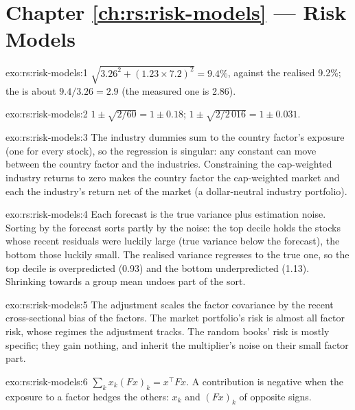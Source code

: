 \section*{Chapter \ref{ch:rs:risk-models} --- Risk Models}

\begin{solution}{exo:rs:risk-models:1}
$\sqrt{3.26^2 + (1.23 \times 7.2)^2} = 9.4\%$, against the realised 9.2\%; the  is about $9.4/3.26 = 2.9$ (the measured one is 2.86).
\end{solution}

\begin{solution}{exo:rs:risk-models:2}
$1 \pm \sqrt{2/60} = 1 \pm 0.18$; $1 \pm \sqrt{2/2\,016} = 1 \pm 0.031$.
\end{solution}

\begin{solution}{exo:rs:risk-models:3}
The industry dummies sum to the country factor's exposure (one for every stock), so the regression is singular: any constant can move between the country
factor and the industries. Constraining the cap-weighted industry returns to zero makes the country factor the cap-weighted market and each 
the industry's return net of the market (a dollar-neutral industry portfolio).
\end{solution}

\begin{solution}{exo:rs:risk-models:4}
Each forecast is the true variance plus estimation noise. Sorting by the forecast sorts partly by the noise: the top decile holds the stocks whose recent residuals
were luckily large (true variance below the forecast), the bottom those luckily small. The realised variance regresses to the true one, so the top decile is
overpredicted (0.93) and the bottom underpredicted (1.13). Shrinking towards a group mean undoes part of the sort.
\end{solution}

\begin{solution}{exo:rs:risk-models:5}
The adjustment scales the factor covariance by the recent cross-sectional bias of the factors. The market portfolio's risk is almost all factor risk, whose regimes
the adjustment tracks. The random books' risk is mostly specific; they gain nothing, and inherit the multiplier's noise on their small factor part.
\end{solution}

\begin{solution}{exo:rs:risk-models:6}
$\sum_k x_k (Fx)_k = x^\top F x$. A contribution is negative when the exposure to a factor hedges the others: $x_k$ and $(Fx)_k$ of opposite signs.
\end{solution}

